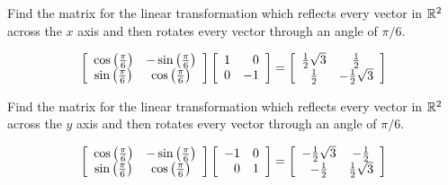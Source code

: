 \begin{enumialphparenastyle}
\begin{ex} Find the matrix for the linear transformation which reflects every
vector in $\mathbb{R}^{2}$ across the $x$ axis and then rotates every vector
through an angle of $\pi /6$.
\begin{sol}
\[
\left[
\begin{array}{cc}
\cos \left( \frac{\pi }{6}\right)  & -\sin \left( \frac{\pi }{6}\right)  \\
\sin \left( \frac{\pi }{6}\right)  & \cos \left( \frac{\pi }{6}\right)
\end{array}
\right] \left[
\begin{array}{rr}
1 & 0 \\
0 & -1
\end{array}
\right] =  \left[
\begin{array}{cc}
\frac{1}{2}\sqrt{3} & \frac{1}{2} \\
\frac{1}{2} & -\frac{1}{2}\sqrt{3}
\end{array}
\right]
\]
\end{sol}
\end{ex}

\begin{ex} Find the matrix for the linear transformation which reflects every
vector in $\mathbb{R}^{2}$ across the $y$ axis and then rotates every vector
through an angle of $\pi /6$.
\begin{sol}
\[
\left[
\begin{array}{cc}
\cos \left( \frac{\pi }{6}\right)  & -\sin \left( \frac{\pi }{6}\right)  \\
\sin \left( \frac{\pi }{6}\right)  & \cos \left( \frac{\pi }{6}\right)
\end{array}
\right] \left[
\begin{array}{rr}
-1 & 0 \\
0 & 1
\end{array}
\right] = \left[
\begin{array}{cc}
-\frac{1}{2}\sqrt{3} & -\frac{1}{2} \\
-\frac{1}{2} & \frac{1}{2}\sqrt{3}
\end{array}
\right]
\]
\end{sol}
\end{ex}


\end{enumialphparenastyle}
